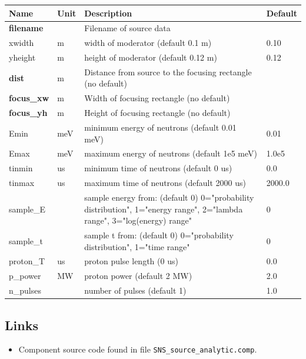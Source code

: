 \begin{longtable}{p{}p{}p{}p{}}
\toprule
\textbf{Name} & \textbf{Unit} & \textbf{Description} & \textbf{Default} \\
\midrule
\endhead
\textbf{filename} &  & Filename of source data &  \\
xwidth & m & width of moderator (default 0.1 m) & 0.10 \\
yheight & m & height of moderator (default 0.12 m) & 0.12 \\
\textbf{dist} & m & Distance from source to the focusing rectangle (no default) &  \\
\textbf{focus\_xw} & m & Width of focusing rectangle (no default) &  \\
\textbf{focus\_yh} & m & Height of focusing rectangle (no default) &  \\
Emin & meV & minimum energy of neutrons (default 0.01 meV) & 0.01 \\
Emax & meV & maximum energy of neutrons (default 1e5 meV) & 1.0e5 \\
tinmin & us & minimum time of neutrons (default 0 us) & 0.0 \\
tinmax & us & maximum time of neutrons (default 2000 us) & 2000.0 \\
sample\_E &  & sample energy from:  (default 0) 0="probability distribution", 1="energy range", 2="lambda range", 3="log(energy) range" & 0 \\
sample\_t &  & sample t from:  (default 0) 0="probability distribution", 1="time range" & 0 \\
proton\_T & us & proton pulse length  (0 us) & 0.0 \\
p\_power & MW & proton power (default 2 MW) & 2.0 \\
n\_pulses &  & number of pulses (default 1) & 1.0 \\
\bottomrule
\end{longtable}

\subsection*{Links}
\begin{itemize}
  \item Component source code found in file \texttt{SNS\_source\_analytic.comp}.
\end{itemize}
